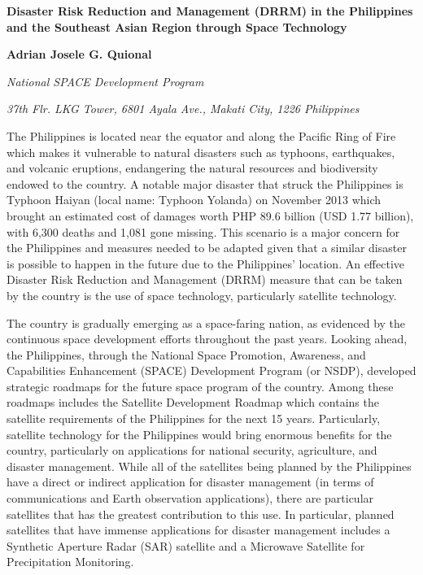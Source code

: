 	\begin{center}
	{\large \bfseries Disaster Risk Reduction and Management (DRRM) in the Philippines and the Southeast Asian Region through 
Space Technology\par}
	\vspace{0.5 cm}
	{\bfseries Adrian Josele G. Quional\par}
	{\itshape National SPACE Development Program\par}
	{\itshape 37th Flr. LKG Tower, 6801 Ayala Ave., Makati City, 1226 Philippines\par}
	\end{center}
	{\tab The Philippines is located near the equator and along the Pacific Ring of Fire which makes it vulnerable to natural disasters such as typhoons, earthquakes, and volcanic eruptions, endangering the natural resources and biodiversity endowed to the country. A notable major disaster that struck the Philippines is Typhoon Haiyan (local name: Typhoon Yolanda) on November 2013 which brought an estimated cost of damages worth PHP 89.6 billion (USD 1.77 billion), with 6,300 deaths and 1,081 gone missing. This scenario is a major concern for the Philippines and measures needed to be adapted given that a similar disaster is possible to happen in the future due to the Philippines' location. An effective Disaster Risk Reduction and Management (DRRM) measure that can be taken by the country is the use of space technology, particularly satellite technology.
		
\vspace{0.4 cm}
  
The country is gradually emerging as a space-faring nation, as evidenced by the continuous space development efforts throughout the past years. Looking ahead, the Philippines, through the National Space Promotion, Awareness, and Capabilities Enhancement (SPACE) Development Program (or NSDP), developed strategic roadmaps for the future space program of the country. Among these roadmaps includes the Satellite Development Roadmap which contains the satellite requirements of the Philippines for the next 15 years. Particularly, satellite technology for the Philippines would bring enormous benefits for the country, particularly on applications for national security, agriculture, and disaster management. While all of the satellites being planned by the Philippines have a direct or indirect application for disaster management (in terms of communications and Earth observation applications), there are particular satellites that has the greatest contribution to this use. In particular, planned satellites that have immense applications for disaster management includes a Synthetic Aperture Radar (SAR) satellite and a Microwave Satellite for Precipitation Monitoring. 
		
}
